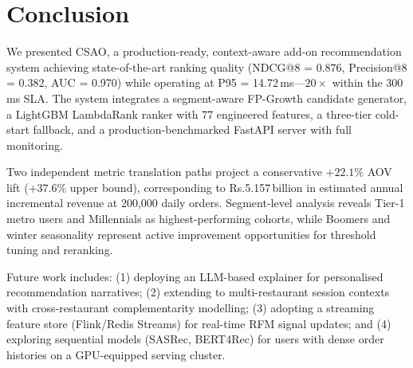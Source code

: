 \documentclass[conference]{IEEEtran}
\newcommand{\rupee}{Rs.}
\begin{document}
\section{Conclusion}

We presented CSAO, a production-ready, context-aware add-on
recommendation system achieving state-of-the-art ranking quality
(NDCG@8 = 0.876, Precision@8 = 0.382, AUC = 0.970) while operating at
P95 = 14.72\,ms---$20\times$ within the 300\,ms SLA. The system integrates
a segment-aware FP-Growth candidate generator, a LightGBM LambdaRank ranker
with 77 engineered features, a three-tier cold-start fallback, and a
production-benchmarked FastAPI server with full monitoring.

Two independent metric translation paths project a conservative $+22.1\%$
AOV lift ($+37.6\%$ upper bound), corresponding to \rupee5.157\,billion in
estimated annual incremental revenue at 200,000 daily orders. Segment-level
analysis reveals Tier-1 metro users and Millennials as highest-performing
cohorts, while Boomers and winter seasonality represent active improvement
opportunities for threshold tuning and reranking.

Future work includes: (1) deploying an LLM-based explainer for personalised
recommendation narratives; (2) extending to multi-restaurant session contexts
with cross-restaurant complementarity modelling; (3) adopting a streaming
feature store (Flink/Redis Streams) for real-time RFM signal updates;
and (4) exploring sequential models (SASRec, BERT4Rec) for users with
dense order histories on a GPU-equipped serving cluster.
\end{document}
